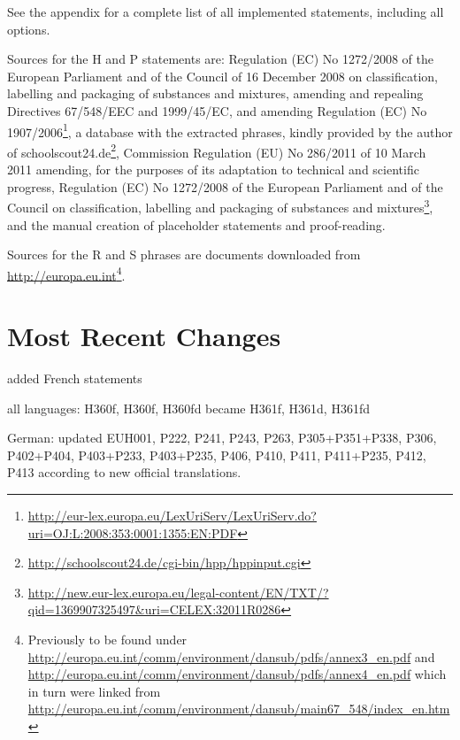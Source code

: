 \documentclass[a4paper,notitlepage,parskip=half]{scrreprt}
\newenvironment{annotation}{\bgroup\footnotesize}{\par\egroup}
\begin{document}
See the appendix for a complete list of all implemented statements, including
all options.

\begin{annotation}\RaggedRight Sources for the H and P statements are:
Regulation (EC) No 1272/2008 of the European Parliament and of the Council of 16
December 2008 on classification, labelling and packaging of substances and
mixtures, amending and repealing Directives 67/548/EEC and 1999/45/EC, and
amending Regulation (EC) No
1907/2006\footnote{\url{http://eur-lex.europa.eu/LexUriServ/LexUriServ.do?uri=OJ:L:2008:353:0001:1355:EN:PDF}},
a database with the extracted phrases, kindly provided by the author of
schoolscout24.de\footnote{\url{http://schoolscout24.de/cgi-bin/hpp/hppinput.cgi}},
Commission Regulation (EU) No 286/2011 of 10 March 2011 amending, for the
purposes of its adaptation to technical and scientific progress, Regulation (EC)
No 1272/2008 of the European Parliament and of the Council on classification,
labelling and packaging of substances and
mixtures\footnote{\url{http://new.eur-lex.europa.eu/legal-content/EN/TXT/?qid=1369907325497\&uri=CELEX:32011R0286}},
and the manual creation of placeholder statements and proof-reading.

Sources for the R and S phrases are documents downloaded from
\url{http://europa.eu.int}\footnote{Previously to be found under
\url{http://europa.eu.int/comm/environment/dansub/pdfs/annex3_en.pdf} and
\url{http://europa.eu.int/comm/environment/dansub/pdfs/annex4_en.pdf} which in
turn were linked from
\url{http://europa.eu.int/comm/environment/dansub/main67_548/index_en.htm}}.
\end{annotation}


\clearpage
\section{Most Recent Changes}%

\begin{compactitem}
  \item added French statements
  \item all languages: H360f, H360f, H360fd became H361f, H361d, H361fd
  \item German: updated EUH001, P222, P241, P243, P263, P305+P351+P338, P306, P402+P404, P403+P233, P403+P235, P406, P410, P411, P411+P235, P412, P413 according to new official translations.
\end{compactitem}
\end{document}
